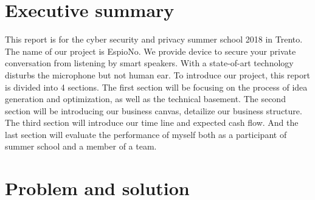 \documentclass[12pt,twoside]{article}
\newcommand{\rr}{\raggedright} %
\begin{document}
\maketitle

\centering
\section*{Executive summary}

This report is for the cyber security and privacy summer school 2018 in Trento. The name of our project
is EspioNo. We provide device to secure your private conversation from listening by smart speakers.
With a state-of-art technology disturbs the microphone but not human ear.
To introduce our project, this report is divided into 4 sections.
The first section will be focusing on the process of idea generation and optimization, as well as the technical basement.
The second section will be introducing our business canvas, detailize our business structure.
The third section will introduce our time line and expected cash flow. And the last section will evaluate the performance 
of myself both as a participant of summer school and a member of a team.



\clearpage

\tableofcontents



\clearpage
\rr

\section{Problem and solution}
\label{sec:Problem and solution}
\end{document}
